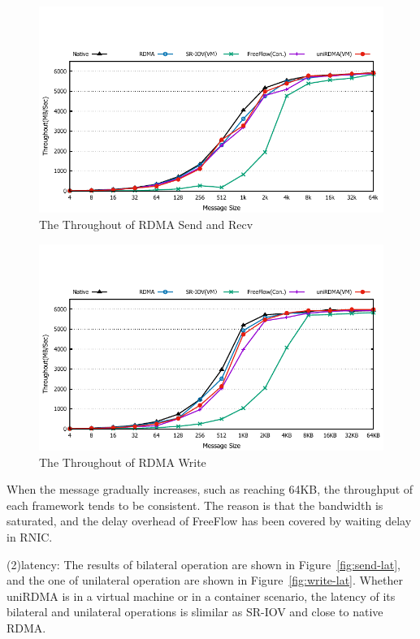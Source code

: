 \begin{figure}[!ht]
	\centering
	\includegraphics[width=1.0\linewidth]{images/send-bw.pdf}
	\caption{The Throughout of RDMA Send and Recv}
	\label{fig:send-bw}
\end{figure}

\begin{figure}[!ht]
	\centering
	\includegraphics[width=1.0\linewidth]{images/write-bw.pdf}
	\caption{The Throughout of RDMA Write}
	\label{fig:write-bw}
\end{figure}

When the message gradually increases, such as reaching 64KB, the throughput of each framework tends to be consistent. The reason is that the bandwidth is saturated, and the delay overhead of FreeFlow has been covered by waiting delay in RNIC.

(2)latency: The results of bilateral operation are shown in Figure~\ref{fig:send-lat}, and the one of unilateral operation are shown in Figure~\ref{fig:write-lat}. Whether uniRDMA is in a virtual machine or in a container scenario, the latency of its bilateral and unilateral operations is slimilar as SR-IOV and close to native RDMA.

